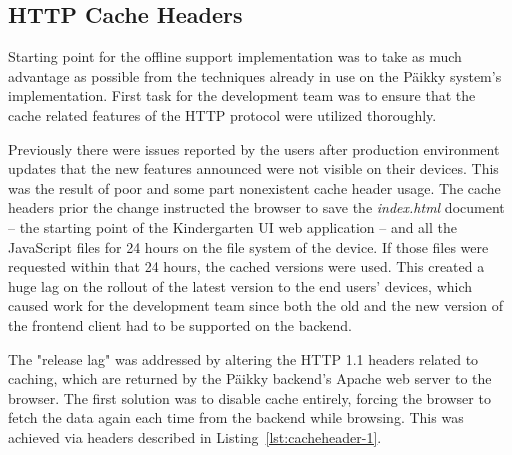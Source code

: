 \subsection{HTTP Cache Headers}
\label{subsec:cacheheaders}


Starting point for the offline support implementation was to take as much advantage as possible from the techniques already in use on the Päikky system's implementation. First task for the development team was to ensure that the cache related features of the HTTP protocol were utilized thoroughly.

Previously there were issues reported by the users after production environment updates that the new features announced were not visible on their devices. This was the result of poor and some part nonexistent cache header usage. The cache headers prior the change instructed the browser to save the \textit{index.html} document – the starting point of the Kindergarten UI web application – and all the JavaScript files for 24 hours on the file system of the device. If those files were requested within that 24 hours, the cached versions were used. This created a huge lag on the rollout of the latest version to the end users' devices, which caused work for the development team since both the old and the new version of the frontend client had to be supported on the backend.

The "release lag" was addressed by altering the HTTP 1.1 headers related to caching, which are returned by the Päikky backend's Apache web server to the browser. The first solution was to disable cache entirely, forcing the browser to fetch the data again each time from the backend while browsing. This was achieved via headers described in Listing~\ref{lst:cacheheader-1}.

